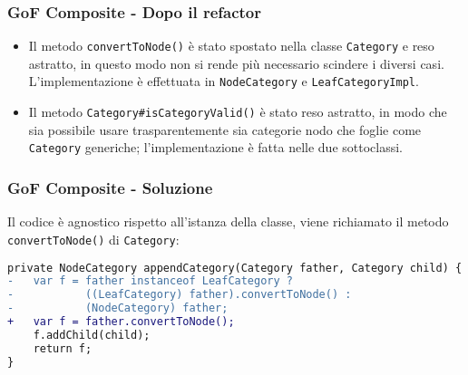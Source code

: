 \begin{frame}
    \frametitle{GoF Composite - Dopo il refactor}

    \begin{minipage}{.43\textwidth}
        \begin{figure}
            \centering
        \end{figure}
    \end{minipage}
    \begin{minipage}{.55\textwidth}
        \begin{itemize}
            \item<1-> Il metodo \texttt{convertToNode()} è stato spostato nella classe \texttt{Category} e reso astratto, in questo modo non si rende più necessario scindere i diversi casi. L'implementazione è effettuata in \texttt{NodeCategory} e \texttt{LeafCategoryImpl}.
            \item<2-> Il metodo \texttt{Category#isCategoryValid()} è stato reso astratto, in modo che sia possibile usare trasparentemente sia categorie nodo che foglie come \texttt{Category} generiche; l'implementazione è fatta nelle due sottoclassi.
        \end{itemize}
    \end{minipage}

\end{frame}

\begin{frame}[fragile]
    \frametitle{GoF Composite - Soluzione}

    Il codice è agnostico rispetto all'istanza della classe, viene richiamato il metodo \texttt{convertToNode()} di \texttt{Category}:

    \lstset{style=java}
    \begin{lstlisting}[language=diff, caption={Post refactor}]
private NodeCategory appendCategory(Category father, Category child) {
-   var f = father instanceof LeafCategory ?
-           ((LeafCategory) father).convertToNode() : 
-           (NodeCategory) father;
+   var f = father.convertToNode();
    f.addChild(child);
    return f;
}
    \end{lstlisting}

\end{frame}

